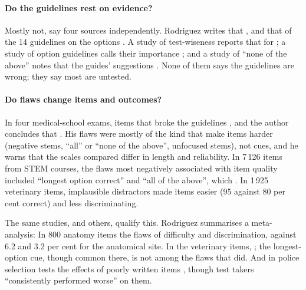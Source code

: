 \paragraph{Do the guidelines rest on evidence?} Mostly not, say four
sources independently.  Rodriguez writes that
, and that of the 14 guidelines on the options
.  A
study of test-wiseness reports that for
; a study of option guidelines calls their
importance ; and a study
of \enquote{none of the above} notes that the guides' suggestions
.
None of them says the guidelines are wrong; they say most are untested.

\paragraph{Do flaws change items and outcomes?}
In four medical-school exams, items that broke the guidelines
, and the author
concludes that .  His flaws were mostly of the kind that make items harder
(negative stems, \enquote{all} or \enquote{none of the above}, unfocused
stems), not cues, and he warns that the scales compared differ in length
and reliability.  In 7\,126 items from STEM courses, the flaws most
negatively associated with item quality included \enquote{longest option
correct} and \enquote{all of the above}, which
.  In 1\,925 veterinary
items, implausible distractors made items easier (95 against 80 per cent
correct) and less discriminating\autocite[6]{Rush2016}.

The same studies, and others, qualify this.  Rodriguez summarises a
meta-analysis:   In 800
anatomy items the flaws 
of difficulty and discrimination, against 6.2 and 3.2 per cent for the
anatomical site.  In the veterinary items, ; the longest-option cue, though common
there, is not among the flaws that did.
And in police selection tests the effects of poorly written items
, though test takers
\enquote{consistently performed worse} on them.

